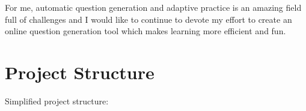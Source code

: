 \documentclass[12pt, twoside]{fithesis2}		%
\renewcommand{\_}{\leavevmode \kern0.07em\vbox{\hrule width0.4em}}
\begin{document}
For me, automatic question generation and adaptive practice is an amazing field full of challenges
and I would like to continue to devote my effort to create an online question generation tool which makes learning more efficient and fun.




\appendix


\printbibliography

\chapter{Project Structure}
\label{chap:project-structure}

Simplified project structure:
\end{document}
